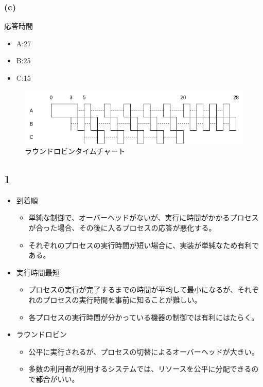 \documentclass[a4paper,10pt]{jsarticle}
\begin{document}
\subsubsection*{(c)}
応答時間
\begin{itemize}
  \item A:27
  \item B:25
  \item C:15
\end{itemize}

\begin{figure}[H]
  \centering
  \includegraphics[width=\linewidth]{./03.drawio.png}
  \caption{ラウンドロビンタイムチャート}
  \label{ラウンドロビンタイムチャート}
\end{figure}

\subsection*{1}
\begin{itemize}
  \item 到着順
        \begin{itemize}
          \item 単純な制御で、オーバーヘッドがないが、実行に時間がかかるプロセスが合った場合、その後に入るプロセスの応答が悪化する。
          \item それぞれのプロセスの実行時間が短い場合に、実装が単純なため有利である。
        \end{itemize}
  \item 実行時間最短
        \begin{itemize}
          \item プロセスの実行が完了するまでの時間が平均して最小になるが、それぞれのプロセスの実行時間を事前に知ることが難しい。
          \item 各プロセスの実行時間が分かっている機器の制御では有利にはたらく。
        \end{itemize}
  \item ラウンドロビン
        \begin{itemize}
          \item 公平に実行されるが、プロセスの切替によるオーバーヘッドが大きい。
          \item 多数の利用者が利用するシステムでは、リソースを公平に分配できるので都合がいい。
        \end{itemize}
\end{itemize}
\end{document}
